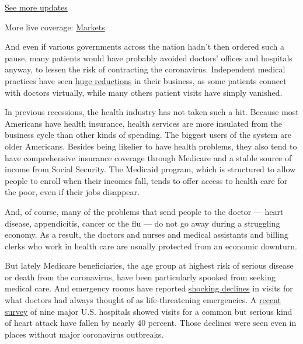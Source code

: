 \href{https://www.nytimes3xbfgragh.onion/2020/08/01/world/coronavirus-covid-19.html?action=click\&pgtype=Article\&state=default\&region=MAIN_CONTENT_1\&context=storylines_live_updates}{See
more updates}

More live coverage:
\href{https://www.nytimes3xbfgragh.onion/live/2020/07/31/business/stock-market-today-coronavirus?action=click\&pgtype=Article\&state=default\&region=MAIN_CONTENT_1\&context=storylines_live_updates}{Markets}

And even if various governments across the nation hadn't then ordered
such a pause, many patients would have probably avoided doctors' offices
and hospitals anyway, to lessen the risk of contracting the coronavirus.
Independent medical practices have seen
\href{https://www.nytimes3xbfgragh.onion/2020/05/05/health/coronavirus-primary-care-doctor.html}{huge
reductions} in their business, as some patients connect with doctors
virtually, while many others patient visits have simply vanished.

In previous recessions, the health industry has not taken such a hit.
Because most Americans have health insurance, health services are more
insulated from the business cycle than other kinds of spending. The
biggest users of the system are older Americans. Besides being likelier
to have health problems, they also tend to have comprehensive insurance
coverage through Medicare and a stable source of income from Social
Security. The Medicaid program, which is structured to allow people to
enroll when their incomes fall, tends to offer access to health care for
the poor, even if their jobs disappear.

And, of course, many of the problems that send people to the doctor ---
heart disease, appendicitis, cancer or the flu --- do not go away during
a struggling economy. As a result, the doctors and nurses and medical
assistants and billing clerks who work in health care are usually
protected from an economic downturn.

But lately Medicare beneficiaries, the age group at highest risk of
serious disease or death from the coronavirus, have been particularly
spooked from seeking medical care. And emergency rooms have reported
\href{https://www.nytimes3xbfgragh.onion/2020/04/06/well/live/coronavirus-doctors-hospitals-emergency-care-heart-attack-stroke.html}{shocking
declines} in visits for what doctors had always thought of as
life-threatening emergencies. A
\href{http://www.onlinejacc.org/content/accj/early/2020/04/07/j.jacc.2020.04.011.full.pdf}{recent
survey} of nine major U.S. hospitals showed visits for a common but
serious kind of heart attack have fallen by nearly 40 percent. Those
declines were seen even in places without major coronavirus outbreaks.

